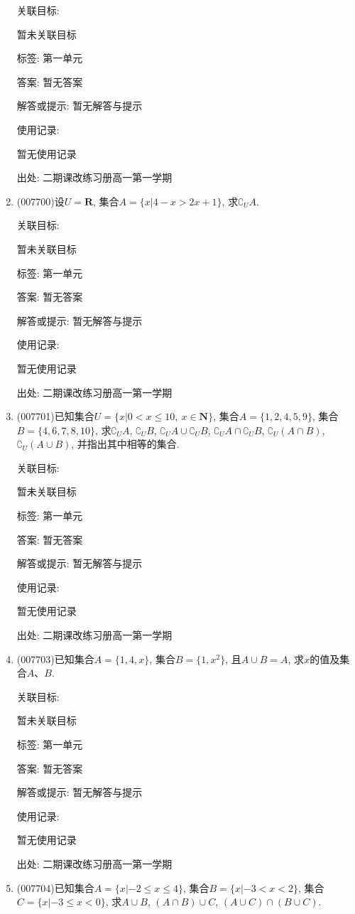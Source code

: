 \documentclass[10pt,a4paper]{article}
\begin{document}
\begin{enumerate}[1.]
关联目标:

暂未关联目标



标签: 第一单元

答案: 暂无答案

解答或提示: 暂无解答与提示

使用记录:

暂无使用记录


出处: 二期课改练习册高一第一学期
\item { (007700)}设$U=\mathbf{R}$, 集合$A=\{x|4-x>2x+1\}$, 求$\complement _UA$.


关联目标:

暂未关联目标



标签: 第一单元

答案: 暂无答案

解答或提示: 暂无解答与提示

使用记录:

暂无使用记录


出处: 二期课改练习册高一第一学期
\item { (007701)}已知集合$U=\{x|0<x\le 10, \ x\in \mathbf{N}\}$, 集合$A=\{1,2,4,5,9\}$, 集合$B=\{4,6,7,8,10\}$, 求$\complement _UA$, $\complement _UB$, $\complement _UA\cup \complement _UB$, $\complement _UA\cap \complement _UB$, $\complement _U(A\cap B)$, $\complement _U(A\cup B)$, 并指出其中相等的集合.


关联目标:

暂未关联目标



标签: 第一单元

答案: 暂无答案

解答或提示: 暂无解答与提示

使用记录:

暂无使用记录


出处: 二期课改练习册高一第一学期
\item { (007703)}已知集合$A=\{1,4,x\}$, 集合$B=\{1,x^2\}$, 且$A\cup B=A$, 求$x$的值及集合$A$、$B$.


关联目标:

暂未关联目标



标签: 第一单元

答案: 暂无答案

解答或提示: 暂无解答与提示

使用记录:

暂无使用记录


出处: 二期课改练习册高一第一学期
\item { (007704)}已知集合$A=\{x|-2\le x\le 4\}$, 集合$B=\{x|-3<x<2\}$, 集合$C=\{x|-3\le x<0\}$, 求$A\cup B$, $(A\cap B)\cup C$, $(A\cup C)\cap (B\cup C)$.



\end{enumerate}
\end{document}
